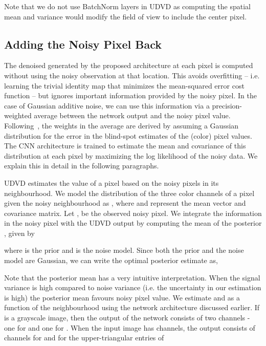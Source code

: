 \documentclass[final]{cvpr}
\begin{document}
\noindent Note that we do not use BatchNorm \cite{batchnorm} layers in UDVD as computing the spatial mean and variance would modify the field of view to include the center pixel. 

\subsection{Adding the Noisy Pixel Back}
\label{sec:add_noisy_back}

The denoised generated by the proposed architecture at each pixel is computed without using the noisy observation at that location. This avoids overfitting -- i.e. learning the trivial identity map that minimizes the mean-squared error cost function -- but ignores important information provided by the noisy pixel. In the case of Gaussian additive noise, we can use this information via a precision-weighted average between the network output and the noisy pixel value. Following~\cite{blindspotnet}, the weights in the average are derived by assuming a Gaussian distribution for the error in the blind-spot estimates of the (color) pixel values. The CNN architecture is trained to estimate the mean and covariance of this distribution at each pixel by maximizing the log likelihood of the noisy data. We explain this in detail in the following paragraphs. 

UDVD estimates the value of a pixel based on the noisy pixels in its neighbourhood. We model the distribution of the three color channels of a pixel  given the noisy neighbourhood  as , where  and  represent the mean vector and covariance matrix. Let ,  be the observed noisy pixel. We integrate the information in the noisy pixel with the UDVD output by computing the mean of the posterior , given by 

where  is the prior and  is the noise model. Since both the prior and the noise model are Gaussian, we can write the optimal posterior estimate as, 



Note that the posterior mean has a very intuitive interpretation. When the signal variance is high compared to noise variance (i.e. the uncertainty in our estimation is high) the posterior mean favours noisy pixel value. We estimate  and  as a function of the neighbourhood  using the network architecture discussed earlier. If  is a grayscale image, then the output of the network consists of two channels - one for  and one for . When the input image has  channels, the output consists of  channels for  and  for the upper-triangular entries of 
\end{document}
